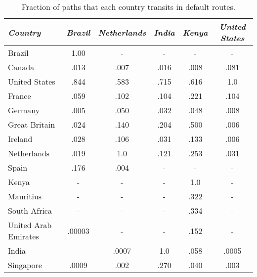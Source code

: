 \begin{table*}[t]
\centering
\begin{tabular}{|P{37mm}|c|c|c|c|c|}
\hline
\textit{Country}    & \textit{Brazil}  & \textit{Netherlands}   & \textit{India} & \textit{Kenya} & \textit{United States}\\
\hline\hline
Brazil              &1.00       & -   & -     & -     & -\\\hline\hline
Canada                &.013       &.007     &.016       &.008      &.081 \\\hline
United States                 &.844        &.583     &.715      &.616       &1.0 \\\hline\hline
France                 &.059     &.102      &.104       &.221      &.104 \\\hline
Germany                 &.005       &.050    &.032      &.048      &.008 \\\hline
Great Britain                &.024       &.140     &.204      &.500      &.006 \\\hline
Ireland                &.028       &.106      &.031     &.133      &.006 \\\hline
Netherlands                 &.019        &1.0      &.121      &.253      &.031 \\\hline
Spain                  &.176       &.004     & -     & -      &- \\\hline\hline
Kenya                 & -       &-    & -      &1.0      &- \\\hline
Mauritius                  & -       & -     & -      &.322       &- \\\hline
South Africa                 &-        & -    & -     &.334       &- \\\hline\hline
United Arab Emirates                  &.00003        & -    & -     &.152       &- \\\hline
India               &  -    &.0007    &1.0     &.058     &.0005 \\\hline
Singapore                 &.0009        &.002     &.270       &.040       &.003 \\\hline
\end{tabular}
\caption{Fraction of paths that each country transits in default routes.}
\label{tab:transit}
\end{table*}

